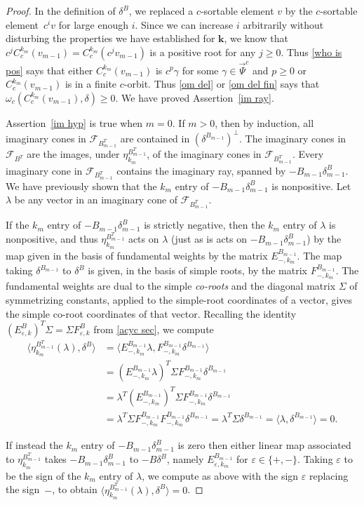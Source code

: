 \documentclass{amsart}
\theoremstyle{definition}
\theoremstyle{remark}
\numberwithin{equation}{section}
\newcommand{\ep}{\varepsilon}
\newcommand{\set}[1]{{\lbrace #1 \rbrace}}
\newcommand{\br}[1]{{\langle #1 \rangle}}
\newcommand{\F}{{\mathcal F}}
\newcommand{\0}{{\mathbf{0}}}
\newcommand{\kk}{\mathbf{k}}
\newcommand{\TravInfChar}{\Psi}
\newcommand{\TravProj}[1]{\overrightarrow{\TravInfChar}^{#1}}
\begin{document}
\begin{proof}
In the definition of $\delta^B$, we replaced a $c$-sortable element $v$ by the $c$-sortable element~$c^iv$ for large enough $i$.
Since we can increase $i$ arbitrarily without disturbing the properties we have established for $\kk$, we know that $c^jC^{k_m}_c(v_{m-1})=C^{k_m}_c(c^jv_{m-1})$ is a positive root for any $j\ge0$.
Thus \cref{who is pos} says that either $C^{k_m}_c(v_{m-1})$ is $c^p\gamma$ for some $\gamma\in\TravProj{c}$ and $p\ge0$ or $C^{k_m}_c(v_{m-1})$ is in a finite $c$-orbit.
Thus \cref{om del} or \cref{om del fin} says that $\omega_c(C^{k_m}_c(v_{m-1}),\delta)\ge0$. 
We have proved Assertion~\ref{im ray}.

Assertion~\ref{im hyp} is true when $m=0$.
If $m>0$, then by induction, all imaginary cones in $\F_{B_{m-1}^T}$ are contained in $(\delta^{B_{m-1}})^\perp$.
The imaginary cones in $\F_{B^T}$ are the images, under $\eta^{B^T_{m-1}}_{k_m}$, of the imaginary cones in $\F_{B_{m-1}^T}$.
Every imaginary cone in $\F_{B_{m-1}^T}$ contains the imaginary ray, spanned by $-B_{m-1}\delta^B_{m-1}$.
We have previously shown that the $k_m$ entry of $-B_{m-1}\delta^B_{m-1}$ is nonpositive.
Let $\lambda$ be any vector in an imaginary cone of $\F_{B_{m-1}^T}$.

If the $k_m$ entry of $-B_{m-1}\delta^B_{m-1}$ is strictly negative, then the $k_m$ entry of $\lambda$ is nonpositive, and thus $\eta^{B^T_{m-1}}_{k_m}$ acts on $\lambda$ (just as is acts on $-B_{m-1}\delta^B_{m-1}$) by the map given in the basis of fundamental weights by the matrix $E_{-,k_m}^{B_{m-1}}$.
The map taking $\delta^{B_{m-1}}$ to $\delta^B$ is given, in the basis of simple roots, by the matrix $F_{-,k_m}^{B_{m-1}}$.
The fundamental weights are dual to the simple \emph{co-roots} and the diagonal matrix $\Sigma$ of symmetrizing constants, applied to the simple-root coordinates of a vector, gives the simple co-root coordinates of that vector.
Recalling the identity $(E_{\ep,k}^B)^T\Sigma=\Sigma F_{\ep,k}^B$ from \cref{acyc sec}, we compute
\begin{align*}
\br{\eta^{B^T_{m-1}}_{k_m}(\lambda),\delta^B}
&=\br{E_{-,k_m}^{B_{m-1}}\lambda,F_{-,k_m}^{B_{m-1}}\delta^{B_{m-1}}}\\
&=(E_{-,k_m}^{B_{m-1}}\lambda)^T\Sigma F_{-,k_m}^{B_{m-1}}\delta^{B_{m-1}}\\
&=\lambda^T(E_{-,k_m}^{B_{m-1}})^T\Sigma F_{-,k_m}^{B_{m-1}}\delta^{B_{m-1}}\\
&=\lambda^T\Sigma F_{-,k_m}^{B_{m-1}}F_{-,k_m}^{B_{m-1}}\delta^{B_{m-1}}=\lambda^T\Sigma\delta^{B_{m-1}}=\br{\lambda,\delta^{B_{m-1}}}=0.
\end{align*}

If instead the $k_m$ entry of $-B_{m-1}\delta^B_{m-1}$ is zero then either linear map associated to $\eta^{B^T_{m-1}}_{k_m}$ takes $-B_{m-1}\delta^B_{m-1}$ to $-B\delta^B$, namely $E_{\ep,k_m}^{B_{m-1}}$ for $\ep\in\set{+,-}$.
Taking $\ep$ to be the sign of the $k_m$ entry of $\lambda$, we compute as above with the sign $\ep$ replacing the sign~$-$, to obtain $\br{\eta^{B^T_{m-1}}_{k_m}(\lambda),\delta^B}=0$.
\end{proof}
\end{document}
